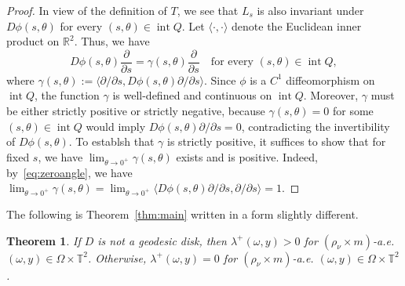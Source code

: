 \documentclass[a4paper,12pt,reqno]{amsart}
\numberwithin{equation}{section}
\newtheorem{theorem}{Theorem}[section]
\newcommand{\Rr}{{\mathbb{R}}}
\newcommand{\Tt}{{\mathbb{T}}}
\begin{document}
\begin{proof}
In view of the definition of $T$, we see that $L_s$ is also invariant under $D\phi(s,\theta)$ for every $(s,\theta) \in \operatorname{int} Q$. Let $\langle \cdot,\cdot \rangle$ denote the Euclidean inner product on $\Rr^2$. Thus, we have
\begin{equation*} 
D\phi(s,\theta) \frac{\partial}{\partial s} = \gamma(s,\theta) \frac{\partial}{\partial s} \quad  \text{for every } (s,\theta) \in \operatorname{int} Q,
\end{equation*}
where $\gamma(s,\theta) := \langle \partial /\partial s,D\phi(s,\theta) \partial /\partial s \rangle$. 
Since $\phi$ is a $C^1$ diffeomorphism on $\operatorname{int} Q$, the function $\gamma$ is well-defined and continuous on $\operatorname{int} Q$. Moreover, $\gamma$ must be either strictly positive or strictly negative, because $\gamma(s,\theta)=0$ for some $(s,\theta) \in \operatorname{int} Q$ would imply $D\phi(s,\theta) \partial/\partial s = 0$, contradicting the invertibility of $D\phi(s,\theta)$. To establsh that $\gamma$ is strictly positive, it suffices to show that for fixed $s$, we have $\lim_{\theta \to 0^+} \gamma(s,\theta)$ exists and is positive. Indeed, by~\eqref{eq:zeroangle}, we have $\lim_{\theta \to 0^+} \gamma(s,\theta) = \lim_{\theta \to 0^+} \langle D\phi(s,\theta) \partial /\partial s,\partial / \partial s \rangle=1$.
\end{proof}

The following is Theorem~\ref{thm:main} written in a form slightly different.

\begin{theorem}
\label{thm:7}
If $D$ is not a geodesic disk, then $\lambda^+(\omega,y)>0$ for $(\rho_\nu\times m)$-a.e. $(\omega,y)\in\Omega\times\Tt^2$. Otherwise, $\lambda^+(\omega,y)=0$ for $(\rho_\nu\times m)$-a.e. $(\omega,y)\in\Omega\times\Tt^2$.
\end{theorem}
\end{document}
